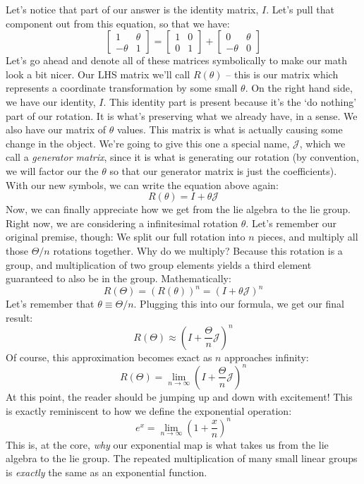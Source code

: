Let's notice that part of our answer is the identity matrix, $I$. Let's pull that component out from this equation, so that we have:
$$\begin{bmatrix}
    1&\theta\\-\theta&1
\end{bmatrix}=\begin{bmatrix}
    1&0\\0&1
\end{bmatrix}+\begin{bmatrix}
    0&\theta\\-\theta&0
\end{bmatrix}$$
Let's go ahead and denote all of these matrices symbolically to make our math look a bit nicer. Our LHS matrix we'll call $R(\theta)$ -- this is our matrix which represents a coordinate transformation by some small $\theta$. On the right hand side, we have our identity, $I$. This identity part is present because it's the `do nothing' part of our rotation. It is what's preserving what we already have, in a sense. We also have our matrix of $\theta$ values. This matrix is what is actually causing some change in the object. We're going to give this one a special name, $\mathcal{J}$, which we call a \textit{generator matrix}, since it is what is generating our rotation (by convention, we will factor our the $\theta$ so that our generator matrix is just the coefficients). With our new symbols, we can write the equation above again:
$$R(\theta)=I+\theta\mathcal{J}$$
Now, we can finally appreciate how we get from the \gls{lie algebra} to the \gls{lie group}. Right now, we are considering a infinitesimal rotation $\theta$. Let's remember our original premise, though: We split our full rotation into $n$ pieces, and multiply all those $\Theta/n$ rotations together. Why do we multiply? Because this rotation is a group, and multiplication of two group elements yields a third element guaranteed to also be in the group. Mathematically:
$$R(\Theta)=\left(R(\theta)\right)^n=\left(I+\theta\mathcal{J}\right)^n$$
Let's remember that $\theta\equiv\Theta/n$. Plugging this into our formula, we get our final result:
$$R(\Theta)\approx\left(I+\frac{\Theta}{n}\mathcal{J}\right)^n$$
Of course, this approximation becomes exact as $n$ approaches infinity:
$$R(\Theta)=\lim_{n\rightarrow\infty}\left(I+\frac{\Theta}{n}\mathcal{J}\right)^n$$
At this point, the reader should be jumping up and down with excitement! This is exactly reminiscent to how we define the exponential operation:
$$e^x=\lim_{n\rightarrow\infty}{\left(1+\frac{x}{n}\right)^n}$$
This is, at the core, \textit{why} our exponential map is what takes us from the \gls{lie algebra} to the \gls{lie group}. The repeated multiplication of many small linear groups is \textit{exactly} the same as an exponential function.

